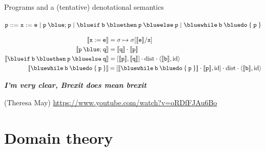 \documentclass{beamer}
\begin{document}
\begin{frame}{Programs and a (tentative) denotational semantics}
        \begin{block}{\vspace*{-3.5ex}}
        \begin{center}
        $\prog{p} ::= \mathtt{x} := \mathtt{e} \mid
	\mathtt{p \> {\blue ;} \> p} \mid
	\mathtt{{\blue if} \> b \> {\blue then} \> p \> {\blue else} \> p} \mid
	\mathtt{{\blue while} \> b \> {\blue do} \> \{ \> p \> \}}$
        \end{center}
	\end{block}
        \vspace{-0.5cm}
        \begin{align*}
                \sem{\prog{x : = e}} & = \sigma \mapsto \sigma[\sem{\prog{e}}/\prog{x}] \\
                \sem{\prog{p} \> {\blue ;} \> \prog{q}} & 
                = \sem{\prog{q}} \comp \sem{\prog{p}} \\
                \sem{\mathtt{{\blue if} \> b \> {\blue then} \> p \> {\blue else} \> q}}
                                                        & 
                                                        = [\sem{\prog{p}},\sem{\prog{q}}] \comp
                                                        \mathrm{dist} \comp \pv{\sem{\prog{b}}}{\id}
                \\
                \sem{\mathtt{{\blue while} \> b \> {\blue do} \> \{ \> p \> \}} }
                                                        & \> {=} \>
                [\sem{\mathtt{{\blue while} \> b \> {\blue do} \> \{ \> p \> \}} } \comp 
                \sem{\prog{p}},\id] \comp
                \mathrm{dist} \comp \pv{\sem{\prog{b}}}{\id}
        \end{align*}

        \pause
        \smallskip
        \begin{flushright}
        \emph{\textbf{I'm very clear, Brexit does mean brexit}}

        \scriptsize{(Theresa May) \url{https://www.youtube.com/watch?v=oRDfFJAu6Bo}}
        \end{flushright}

\end{frame}

\section{Domain theory}
\end{document}
